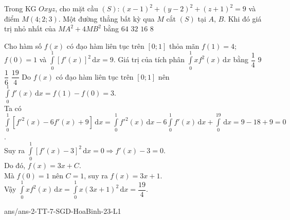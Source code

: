 \begin{ex}%
	Trong KG $Oxyz$, cho mặt cầu $(S)\colon (x-1)^2+(y-2)^2+(z+1)^2=9$ và điểm $M(4;2;3)$. Một đường thẳng bất kỳ qua $M$ cắt $(S)$ tại $A$, $B$. Khi đó giá trị nhỏ nhất của $MA^2+4MB^2$ bằng
	\choice
	{\True $64$}
	{$32$}
	{$16$}
	{$8$}
\end{ex}
\begin{ex}%
	Cho hàm số $f(x)$ có đạo hàm liên tục trên $[0;1]$ thỏa mãn $f(1)=4$; $f(0)=1$ và $\displaystyle\int\limits_0^1\left[f'(x)\right]^2\mathrm{\,d}x=9$. Giá trị của tích phân $\displaystyle\int\limits_0^1xf^2(x)\mathrm{\,d}x$ bằng
	\choice
	{$\dfrac{1}{4}$}
	{$9$}
	{$\dfrac{1}{6}$}
	{\True $\dfrac{19}{4}$}
	\loigiai
	{
	Do $f(x)$ có đạo hàm liên tục trên $[0;1]$ nên $\displaystyle\int\limits_0^1f'(x)\mathrm{\,d}x=f(1)-f(0)=3$.\\
Ta có $\displaystyle\int\limits_0^1\left[f'^2(x)-6f'(x)+9\right]\mathrm{\,d}x=\displaystyle\int\limits_0^1f'^2(x)\mathrm{\,d}x-6\displaystyle\int\limits_0^1f'(x)\mathrm{\,d}x+\displaystyle\int\limits_0^19\mathrm{\,d}x=9-18+9=0$.\\
Suy ra $\displaystyle\int\limits_0^1\left[f'(x)-3\right]^2\mathrm{\,d}x=0\Rightarrow f'(x)-3=0$.\\
Do đó, $f(x)=3x+C$.\\
Mà $f(0)=1$ nên $C=1$, suy ra $f(x)=3x+1$.\\
Vậy $\displaystyle\int\limits_0^1xf^2(x)\mathrm{\,d}x=\displaystyle\int\limits_0^1x(3x+1)^2\mathrm{\,d}x=\dfrac{19}{4}$.
}
\end{ex}
\begin{indapan}{10}
	{ans/ans-2-TT-7-SGD-HoaBinh-23-L1}
\end{indapan}


